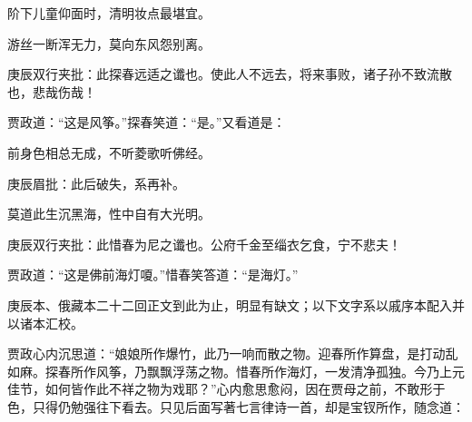 \begin{poem}
    \begin{pl}阶下儿童仰面时，清明妆点最堪宜。\end{pl}

    \begin{pl}游丝一断浑无力，莫向东风怨别离。\end{pl}
    \begin{note}庚辰双行夹批：此探春远适之谶也。使此人不远去，将来事败，诸子孙不致流散也，悲哉伤哉！\end{note}
\end{poem}


\begin{parag}
    贾政道：“这是风筝。”探春笑道：“是。”又看道是：
\end{parag}


\begin{poem}
    \begin{pl}前身色相总无成，不听菱歌听佛经。\end{pl}\begin{note}庚辰眉批：此后破失，系再补。\end{note}

    \begin{pl}莫道此生沉黑海，性中自有大光明。\end{pl}\begin{note}庚辰双行夹批：此惜春为尼之谶也。公府千金至缁衣乞食，宁不悲夫！ \end{note}
\end{poem}


\begin{parag}
    贾政道：“这是佛前海灯嗄。”惜春笑答道：“是海灯。”
\end{parag}

\begin{note}
    庚辰本、俄藏本二十二回正文到此为止，明显有缺文；以下文字系以戚序本配入并以诸本汇校。
\end{note}

\begin{parag}
    贾政心内沉思道：“娘娘所作爆竹，此乃一响而散之物。迎春所作算盘，是打动乱如麻。探春所作风筝，乃飘飘浮荡之物。惜春所作海灯，一发清净孤独。今乃上元佳节，如何皆作此不祥之物为戏耶？”心内愈思愈闷，因在贾母之前，不敢形于色，只得仍勉强往下看去。只见后面写著七言律诗一首，却是宝钗所作，随念道：
\end{parag}


